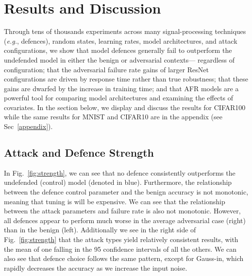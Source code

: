 \section{Results and Discussion}
\label{results}

Through tens of thousands experiments across many signal-processing techniques (\textit{e.g.}, defences), random states, learning rates, model architectures, and attack configurations, we show that model defences generally fail to outperform the undefended model in either the benign or adversarial contexts--- regardless of configuration; that the adversarial failure rate gains of larger ResNet configurations are driven by response time rather than true robustness; that these gains are dwarfed by the increase in training time; and that AFR models are a powerful tool for comparing model architectures and examining the effects of covariates. In the section below, we display and discuss the results for CIFAR100 while the same results for MNIST and CIFAR10 are in the appendix (see Sec~\ref{appendix}).



\subsection{Attack and Defence Strength}
In Fig.~\ref{fig:strength}, we can see that no defence consistently outperforms the undefended (control) model (denoted in blue). Furthermore, the relationship between the defence control parameter and the benign accuracy is not monotonic, meaning that tuning is will be expensive. We can see that the relationship between the attack parameters and failure rate is also not monotonic. However, all defences appear to perform much worse in the average adversarial case (right) than in the benign (left). Additionally we see in the right side of Fig.~\ref{fig:strength} that the attack types yield relatively consistent results, with the mean of one falling in the 95 confidence intervals of all the others. We can also see that defence choice follows the same pattern, except for Gauss-in, which rapidly decreases the accuracy as we increase the input noise.


